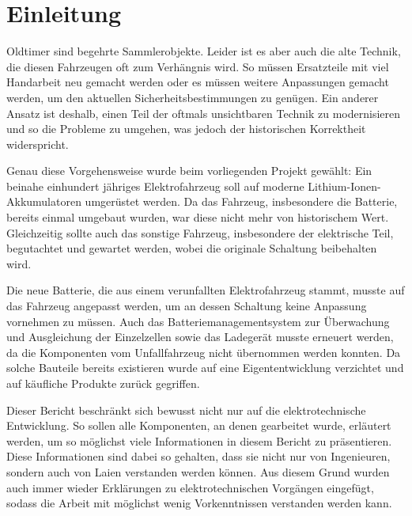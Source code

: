 \chapter{Einleitung}

Oldtimer sind begehrte Sammlerobjekte. Leider ist es aber auch die alte Technik, die diesen Fahrzeugen oft zum Verhängnis wird. So müssen Ersatzteile mit viel Handarbeit neu gemacht werden oder es müssen weitere Anpassungen gemacht werden, um den aktuellen Sicherheitsbestimmungen zu genügen. Ein anderer Ansatz ist deshalb, einen Teil der oftmals unsichtbaren Technik zu modernisieren und so die Probleme zu umgehen, was jedoch der historischen Korrektheit widerspricht.

Genau diese Vorgehensweise wurde beim vorliegenden Projekt gewählt: Ein beinahe einhundert jähriges Elektrofahrzeug soll auf moderne Lithium-Ionen-Akkumulatoren umgerüstet werden. Da das Fahrzeug, insbesondere die Batterie, bereits einmal umgebaut wurden, war diese nicht mehr von historischem Wert. Gleichzeitig sollte auch das sonstige Fahrzeug, insbesondere der elektrische Teil, begutachtet und gewartet werden, wobei die originale Schaltung beibehalten wird.

Die neue Batterie, die aus einem verunfallten Elektrofahrzeug stammt, musste auf das Fahrzeug angepasst werden, um an dessen Schaltung keine Anpassung vornehmen zu müssen. Auch das Batteriemanagementsystem zur Überwachung und Ausgleichung der Einzelzellen sowie das Ladegerät musste erneuert werden, da die Komponenten vom Unfallfahrzeug nicht übernommen werden konnten. Da solche Bauteile bereits existieren wurde auf eine Eigententwicklung verzichtet und auf käufliche Produkte zurück gegriffen.

Dieser Bericht beschränkt sich bewusst nicht nur auf die elektrotechnische Entwicklung. So sollen alle Komponenten, an denen gearbeitet wurde, erläutert werden, um so möglichst viele Informationen in diesem Bericht zu präsentieren. Diese Informationen sind dabei so gehalten, dass sie nicht nur von Ingenieuren, sondern auch von Laien verstanden werden können. Aus diesem Grund wurden auch immer wieder Erklärungen zu elektrotechnischen Vorgängen eingefügt, sodass die Arbeit mit möglichst wenig Vorkenntnissen verstanden werden kann.